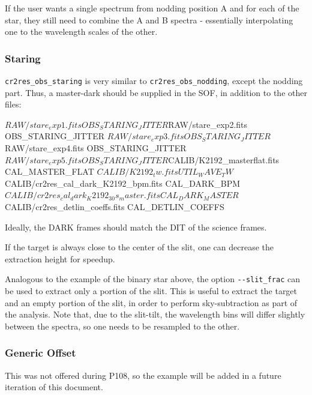 If the user wants a single spectrum from nodding position A and for each of the
star, they still need to combine the A and B spectra - essentially interpolating
one to the wavelength scales of the other.


\subsubsection{Staring}

\verb!cr2res_obs_staring! is very similar to \verb!cr2res_obs_nodding!, except
the nodding part. Thus, a master-dark should be supplied in the SOF, in addition
to the other files:
\begin{shell}[fontsize=\small]
$RAW/stare_exp1.fits        OBS_STARING_JITTER
$RAW/stare_exp2.fits        OBS_STARING_JITTER
$RAW/stare_exp3.fits        OBS_STARING_JITTER
$RAW/stare_exp4.fits        OBS_STARING_JITTER
$RAW/stare_exp5.fits        OBS_STARING_JITTER
$CALIB/K2192_masterflat.fits                  CAL_MASTER_FLAT
$CALIB/K2192_tw.fits                          UTIL_WAVE_TW
$CALIB/cr2res_cal_dark_K2192_bpm.fits         CAL_DARK_BPM
$CALIB/cr2res_cal_dark_K2192_30s_master.fits  CAL_DARK_MASTER
$CALIB/cr2res_detlin_coeffs.fits              CAL_DETLIN_COEFFS
\end{shell}  
Ideally, the DARK frames should match the DIT of the science frames.

If the target is always close to the center of the slit, one can decrease the extraction height for speedup.
\begin{shell}[fontsize=\small]
\end{shell}  

Analogous to the example of the binary star above, the option \verb!--slit_frac!
can be used to extract only a portion of the slit. This is useful to extract the
target and an empty portion of the slit, in order to perform sky-subtraction as
part of the analysis. Note that, due to the slit-tilt, the wavelength bins will
differ slightly between the spectra, so one needs to be resampled to the other.

\subsubsection{Generic Offset}

This was not offered during P108, so the example will be added in a
future iteration of this document.


